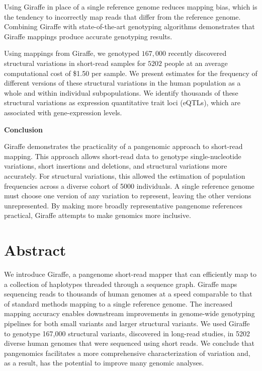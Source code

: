 \documentclass[11pt]{ucscthesis}
\begin{document}
Using Giraffe in place of a single reference genome reduces mapping bias, which is the tendency to incorrectly map reads that differ from the reference genome.
Combining Giraffe with state-of-the-art genotyping algorithms demonstrates that Giraffe mappings produce accurate genotyping results.

Using mappings from Giraffe, we genotyped $167,000$ recently discovered structural variations in short-read samples for $5202$ people at an average computational cost of \$1.50 per sample.
We present estimates for the frequency of different versions of these structural variations in the human population as a whole and within individual subpopulations.
We identify thousands of these structural variations as expression quantitative trait loci (eQTLs), which are associated with gene-expression levels.

\noindent
\textbf{Conclusion}

Giraffe demonstrates the practicality of a pangenomic approach to short-read mapping.
This approach allows short-read data to genotype single-nucleotide variations, short insertions and deletions, and structural variations more accurately.
For structural variations, this allowed the estimation of population frequencies across a diverse cohort of 5000 individuals.
A single reference genome must choose one version of any variation to represent, leaving the other versions unrepresented.
By making more broadly representative pangenome references practical, Giraffe attempts to make genomics more inclusive.

\section{Abstract}
We introduce Giraffe, a pangenome short-read mapper that can efficiently map to a collection of haplotypes threaded through a sequence graph.
Giraffe maps sequencing reads to thousands of human genomes at a speed comparable to that of standard methods mapping to a single reference genome.
The increased mapping accuracy enables downstream improvements in genome-wide genotyping pipelines for both small variants and larger structural variants.
We used Giraffe to genotype 167,000 structural variants, discovered in long-read studies, in 5202 diverse human genomes that were sequenced using short reads.
We conclude that pangenomics facilitates a more comprehensive characterization of variation and, as a result, has the potential to improve many genomic analyses.
\end{document}
